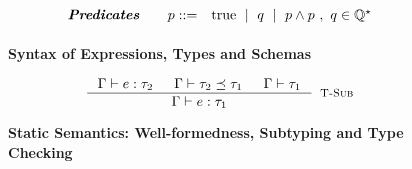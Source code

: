\begin{figure}[t!]
\centering
$$
\begin{array}{rrcl}
\textbf{\emph{Predicates}} \quad
  & p ::=
  & 	\text{true}
  \ \mid \  q
  \ \mid \  p \land p \ , \ q \in \mathbb{Q^\star}
  \\[0.05in] 
\end{array}
$$
\caption{\textbf{Syntax of Expressions, Types and Schemas}}
\label{fig:syntax}
\end{figure}


\begin{figure}[ht!]
\medskip {}

$$\begin{array}{cc}

\inference
  {  \hastype{\Gamma}{e}{\tau_2} && \isSubType{\Gamma}{\tau_2}{\tau_1} 
  && \isWellFormed{\Gamma}{\tau_1}
  }
  {\hastype{\Gamma}{e}{\tau_1}}
  [\tsub]
\end{array}$$

\caption{\textbf{Static Semantics: Well-formedness, Subtyping and Type Checking}}
\label{fig:rules}
\end{figure}